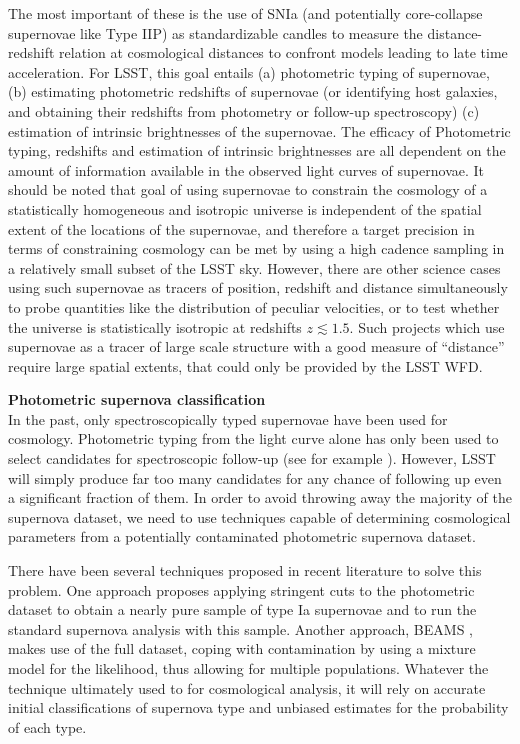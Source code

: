 The most important of these is the use of SNIa (and potentially core-collapse
supernovae like Type IIP) as standardizable candles to measure the
distance-redshift relation at cosmological distances to confront models leading to late time
 acceleration. For LSST, this goal entails (a) photometric typing of supernovae,
 (b) estimating photometric redshifts of supernovae (or identifying host galaxies,
 and obtaining their redshifts from photometry or follow-up spectroscopy)
(c) estimation of intrinsic brightnesses of the supernovae. The efficacy of
Photometric typing, redshifts and estimation of intrinsic brightnesses are all
dependent on the amount of information available in the observed light curves of supernovae.
 It should be noted that goal of using supernovae to constrain the
cosmology of a statistically homogeneous and isotropic universe is independent
of the spatial extent of the locations of the supernovae, and therefore a target
 precision in terms of constraining cosmology can be met by using a high cadence sampling
 in a relatively small subset of the LSST sky. However, there are other science cases
using such supernovae as tracers of position, redshift and distance simultaneously to probe
 quantities like the distribution of peculiar velocities, or to test whether the universe is
statistically isotropic at redshifts $z \lesssim 1.5$. Such projects which use supernovae as a 
tracer of large scale structure with a good measure of ``distance'' require large spatial extents, 
that could only be provided by the LSST WFD.

{\bfseries Photometric supernova classification}\\
In the past, only spectroscopically typed supernovae have been used for cosmology. Photometric 
typing from the light curve alone has only been used to select candidates for spectroscopic 
follow-up (see for example \citet{Sako2008}). However, LSST will simply produce far too many 
candidates for any chance of following up even a significant fraction of them. In order to avoid 
throwing away the majority of the supernova dataset, we need to use techniques capable of 
determining cosmological parameters from a potentially contaminated photometric supernova dataset.

There have been several techniques proposed in recent literature to solve this problem. One 
approach proposes applying stringent cuts to the photometric dataset to obtain a nearly pure sample 
of type Ia supernovae \citep{Bernstein2012,Campbell2013} and to run the standard supernova analysis 
with this sample. Another approach, BEAMS \citep{Kunz2007,Newling2011,Hlozek2012,Knights2013}, 
makes use of the full dataset, coping with contamination by using a mixture model for the 
likelihood, thus allowing for multiple populations. Whatever the technique ultimately used to for 
cosmological analysis, it will rely on accurate initial classifications of supernova type and 
unbiased estimates for the probability of each type.

